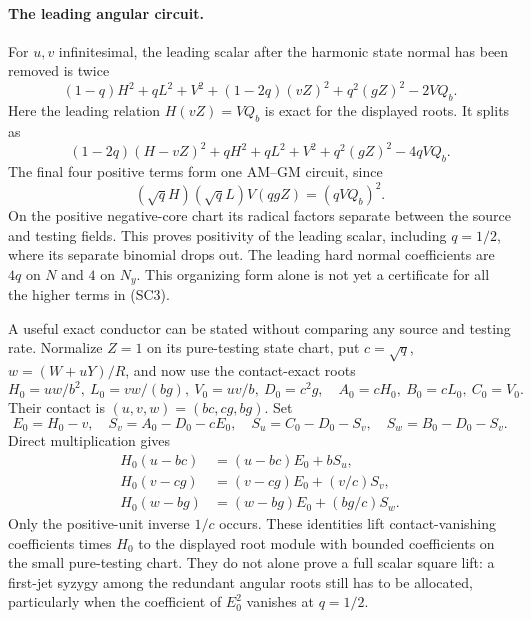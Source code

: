 \paragraph{The leading angular circuit.}
For $u,v$ infinitesimal, the leading scalar after the harmonic state
normal has been removed is twice
\[
 (1-q)H^2+qL^2+V^2+(1-2q)(vZ)^2+q^2(gZ)^2-2VQ_b.
\]
Here the leading relation $H(vZ)=VQ_b$ is exact for the displayed
roots. It splits as
\[
 (1-2q)(H-vZ)^2+
 qH^2+qL^2+V^2+q^2(gZ)^2-4qVQ_b.              \tag{SC6}
\]
The final four positive terms form one AM--GM circuit, since
\[
 (\sqrt qH)(\sqrt qL)V(qgZ)=(qVQ_b)^2.
\]
On the positive negative-core chart its radical factors separate
between the source and testing fields. This proves positivity of the
leading scalar, including $q=1/2$, where its separate binomial drops
out. The leading hard normal coefficients are $4q$ on $N$ and $4$
on $N_y$. This organizing form alone is not yet a certificate for
all the higher terms in (SC3).

A useful exact conductor can be stated without comparing any source
and testing rate. Normalize $Z=1$ on its pure-testing state chart,
put $c=\sqrt q$, $w=(W+uY)/R$, and now use the contact-exact roots
\[
 H_0=uw/b^2,\ L_0=vw/(bg),\ V_0=uv/b,\ D_0=c^2g,
 \quad A_0=cH_0,\ B_0=cL_0,\ C_0=V_0.
\]
Their contact is $(u,v,w)=(bc,cg,bg)$. Set
\[
 E_0=H_0-v,\quad
 S_v=A_0-D_0-cE_0,\quad
 S_u=C_0-D_0-S_v,\quad S_w=B_0-D_0-S_v.
\]
Direct multiplication gives
\[
\begin{aligned}
 H_0(u-bc)&=(u-bc)E_0+bS_u,\\
 H_0(v-cg)&=(v-cg)E_0+(v/c)S_v,\\
 H_0(w-bg)&=(w-bg)E_0+(bg/c)S_w.
\end{aligned}                                                     \tag{SC7}
\]
Only the positive-unit inverse $1/c$ occurs. These identities lift
contact-vanishing coefficients times $H_0$ to the displayed root
module with bounded coefficients on the small pure-testing chart.
They do not alone prove a full scalar square lift: a first-jet
syzygy among the redundant angular roots still has to be allocated,
particularly when the coefficient of $E_0^2$ vanishes at $q=1/2$.

